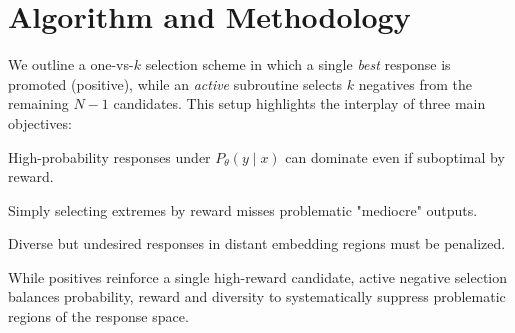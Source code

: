 \section{Algorithm and Methodology}
\label{sec:methodology}

We outline a one-vs-$k$ selection scheme in which a single \emph{best} response is promoted (positive), while an \emph{active} subroutine selects $k$ negatives from the remaining $N-1$ candidates. This setup highlights the interplay of three main objectives:

\vspace{-0.1in}
\begin{description}[leftmargin=1em, itemsep=0pt]
   \item[Probability:] High-probability responses under $P_\theta(y\mid x)$ can dominate even if suboptimal by reward.
   \item[Rewards:] Simply selecting extremes by reward misses problematic "mediocre" outputs.
   \item[Semantics:] Diverse but undesired responses in distant embedding regions must be penalized.
\end{description}

\vspace{-0.15in}
While positives reinforce a single high-reward candidate, active negative selection balances probability, reward and diversity to systematically suppress problematic regions of the response space.



